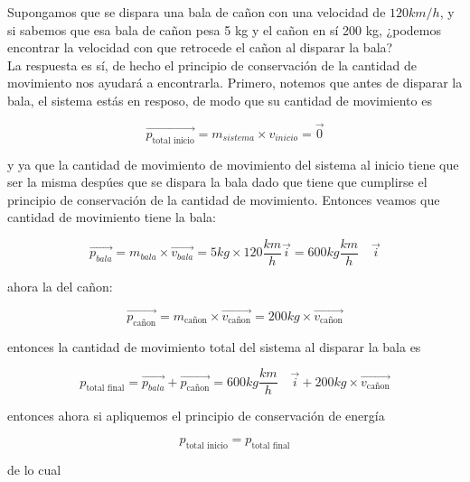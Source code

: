 \vspace{0.2cm}
\begin{tcolorbox}

Supongamos que se dispara una bala de cañon con una velocidad de $120 km/h$, y si sabemos que esa bala de cañon pesa 5 kg y el cañon en sí 200 kg, ¿podemos encontrar la velocidad con que retrocede el cañon al disparar la bala?\\

La respuesta es sí, de hecho el principio de conservación de la cantidad de movimiento nos ayudará a encontrarla. Primero, notemos que antes de disparar la bala, el sistema estás en resposo, de modo que su cantidad de movimiento es 

\begin{equation}
\vec{p_{\text{total inicio}}} = m_{sistema}\times v_{inicio}= \vec{0} 
\end{equation}

y ya que la cantidad de movimiento de movimiento del sistema al inicio tiene que ser la misma despúes que se dispara la bala dado que tiene que cumplirse el principio de conservación de la cantidad de movimiento. Entonces veamos que cantidad de movimiento tiene la bala:

\begin{equation}
\vec{p_{bala}} = m_{bala}\times \vec{v_{bala}}= 5 kg\times 120 \frac{km}{h} \vec{i}= 600 kg\frac{km}{h}\quad \vec{i}
\end{equation}

ahora la del cañon:

\begin{equation*}
\vec{p_{\text{cañon}}} = m_{\text{cañon}}\times \vec{v_{\text{cañon}}}= 200kg\times \vec{v_{\text{cañon}}} 
\end{equation*}

entonces la cantidad de movimiento total del sistema al disparar la bala es

\begin{equation*}
p_{\text{total final}}= \vec{p_{bala}} + \vec{p_{\text{cañon}}} = 600 kg\frac{km}{h}\quad \vec{i}+ 200kg\times \vec{v_{\text{cañon}}}
\end{equation*}

entonces ahora si apliquemos el principio de conservación de energía

\begin{equation*}
p_{\text{total inicio}} = p_{\text{total final}}
\end{equation*}

de lo cual


\end{tcolorbox}
